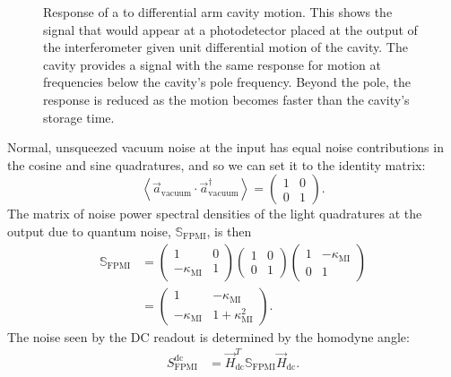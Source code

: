 \begin{figure}
  \centering
  
  \caption[Response of a \FPMI{} to differential arm cavity motion]{\label{fig:fp-mich-response}Response of a \FPMI{} to differential arm cavity motion. This shows the signal that would appear at a photodetector placed at the output of the interferometer given unit differential motion of the cavity. The cavity provides a signal with the same response for motion at frequencies below the cavity's pole frequency. Beyond the pole, the response is reduced as the motion becomes faster than the cavity's storage time.}
\end{figure}

Normal, unsqueezed vacuum noise at the input has equal noise contributions in the cosine and sine quadratures, and so we can set it to the identity matrix:
\begin{equation}
  \label{eq:unsqueezed-vacuum-amplitude}
  \left< \vec{a}_{\text{vacuum}} \cdot \vec{a}_{\text{vacuum}}^{\dag} \right> =
  \begin{pmatrix}
   1 & 0 \\
   0 & 1
  \end{pmatrix}.
\end{equation}
The matrix of noise power spectral densities of the light quadratures at the output due to quantum noise, $\mathbb{S}_{\text{FPMI}}$, is then
\begin{equation}
  \begin{split}
    \mathbb{S}_{\text{FPMI}} &=
    \begin{pmatrix}
      1 & 0 \\
      -\kappa_{\text{MI}} & 1
    \end{pmatrix}
    \begin{pmatrix}
      1 & 0 \\
      0 & 1
    \end{pmatrix}
    \begin{pmatrix}
      1 & -\kappa_{\text{MI}} \\
      0 & 1
    \end{pmatrix} \\
    &=
    \begin{pmatrix}
      1 & -\kappa_{\text{MI}} \\
      -\kappa_{\text{MI}} & 1 + \kappa^2_{\text{MI}}
    \end{pmatrix}.
  \end{split}
\end{equation}
The noise seen by the \gls{DC} readout is determined by the homodyne angle:
\begin{equation}
  \begin{split}
    S_{\text{FPMI}}^{\text{dc}} &= \vec{H}_{\text{dc}}^{T} \mathbb{S}_{\text{FPMI}} \vec{H}_{\text{dc}}.
  \end{split}
\end{equation}

